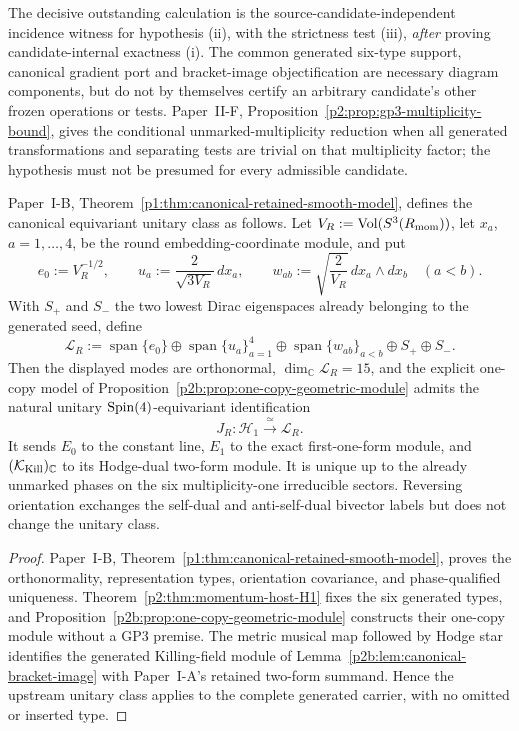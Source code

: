 \documentclass[12pt,a4paper]{article}
\begin{document}
\begin{remark}
\label{p2b:rem:gp3-structured-certificate-obligation}
The decisive outstanding calculation is the source-candidate-independent
incidence witness for hypothesis (ii), with the strictness test (iii),
\emph{after} proving candidate-internal exactness (i).  The common generated
six-type support, canonical gradient port and bracket-image objectification
are necessary diagram components, but do not by themselves certify an
arbitrary candidate's other frozen operations or tests.  Paper~II-F,
Proposition~\ref{p2:prop:gp3-multiplicity-bound}, gives the conditional
unmarked-multiplicity reduction when all generated transformations and
separating tests are trivial on that multiplicity factor; the hypothesis
must not be presumed for every admissible candidate.
\end{remark}

\begin{theorem}
\label{p2b:thm:canonical-retained-smooth-realization}
Paper~I-B, Theorem~\ref{p1:thm:canonical-retained-smooth-model}, defines the
canonical equivariant unitary class as follows.  Let
\(V_R:=\operatorname{Vol}(S^3(R_{\mathrm{mom}}))\), let
\(x_a\), \(a=1,\ldots,4\), be the round embedding-coordinate module, and put
\[
 e_0:=V_R^{-1/2},\qquad
 u_a:=\frac{2}{\sqrt{3V_R}}\,dx_a,\qquad
 w_{ab}:=\sqrt{\frac{2}{V_R}}\,dx_a\wedge dx_b
 \quad(a<b).
\]
With \(S_+\) and \(S_-\) the two lowest Dirac eigenspaces already belonging
to the generated seed, define
\[
 \mathcal L_R
 :=\operatorname{span}\{e_0\}
 \oplus\operatorname{span}\{u_a\}_{a=1}^4
 \oplus\operatorname{span}\{w_{ab}\}_{a<b}
 \oplus S_+\oplus S_-.
\]
Then the displayed modes are orthonormal, \(\dim_{\mathbb C}\mathcal L_R=15\),
and the explicit one-copy model of
Proposition~\ref{p2b:prop:one-copy-geometric-module} admits the natural unitary
\(\mathrm{Spin}(4)\)-equivariant identification
\[
 J_R:\mathcal H_1\xrightarrow{\ \simeq\ }\mathcal L_R.
\]
It sends \(E_0\) to the constant line, \(E_1\) to the exact first-one-form
module, and \((\mathcal K_{\rm Kill})_{\mathbb C}\) to its Hodge-dual
two-form module.  It is unique up to the already unmarked phases on the six
multiplicity-one irreducible sectors.  Reversing orientation exchanges the
self-dual and anti-self-dual bivector labels but does not change the unitary
class.
\end{theorem}

\begin{proof}
Paper~I-B, Theorem~\ref{p1:thm:canonical-retained-smooth-model}, proves the
orthonormality, representation types, orientation covariance, and
phase-qualified uniqueness.  Theorem~\ref{p2:thm:momentum-host-H1} fixes the six generated
types, and Proposition~\ref{p2b:prop:one-copy-geometric-module}
constructs their one-copy module without a GP3 premise.  The metric
musical map followed by Hodge star identifies the
generated Killing-field module of
Lemma~\ref{p2b:lem:canonical-bracket-image} with Paper~I-A's retained two-form
summand.  Hence the upstream unitary class applies to the complete generated
carrier, with no omitted or inserted type.
\end{proof}
\end{document}
